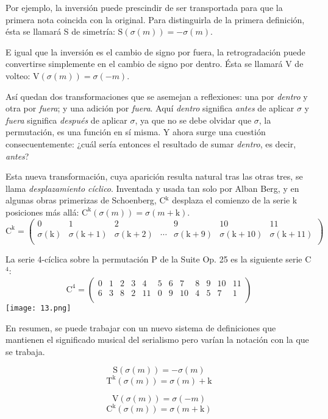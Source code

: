 		Por ejemplo, la inversión puede prescindir de ser transportada para que la primera nota coincida con la original. Para distinguirla de la primera definición, ésta se llamará S de simetría: $\text{S}(\sigma(m)) = -\sigma(m)$.
		
		E igual que la inversión es el cambio de signo por fuera, la retrogradación puede convertirse simplemente en el cambio de signo por dentro. Ésta se llamará V de volteo: $\text{V}(\sigma(m)) = \sigma(-m)$.
		
		Así quedan dos transformaciones que se asemejan a reflexiones: una por \textit{dentro} y otra por \textit{fuera}; y una adición por \textit{fuera}. Aquí \textit{dentro} significa \textit{antes} de aplicar $\sigma$ y \textit{fuera} significa \textit{después} de aplicar $\sigma$, ya que no se debe olvidar que $\sigma$, la permutación, es una función en sí misma. Y ahora surge una cuestión consecuentemente: ¿cuál sería entonces el resultado de sumar \textit{dentro}, es decir, \textit{antes}?
		
		Esta nueva transformación, cuya aparición resulta natural tras las otras tres, se llama \textit{desplazamiento cíclico}. Inventada y usada tan solo por Alban Berg, y en algunas obras primerizas de Schoenberg, C$^\text{k}$ desplaza el comienzo de la serie k posiciones más allá: $\text{C}^\text{k}\left(\sigma\left(m\right)\right)=\sigma\left(m+\text{k}\right)$.
		\[\text{C}^\text{k}=\left(\begin{matrix}0&1&2&&9&10&11\\\sigma\left(\text{k}\right)&\sigma\left(\text{k}+1\right)&\sigma\left(\text{k}+2\right)&\cdots&\sigma\left(\text{k}+9\right)&\sigma\left(\text{k}+10\right)&\sigma\left(\text{k}+11\right)\\\end{matrix}\right)\]
		
		La serie 4-cíclica sobre la permutación P de la Suite Op. 25 es la siguiente serie C$^4$:	
		\[\text{C}^4=\left(\begin{matrix}0&1&2&3&4&5&6&7&8&9&10&11\\6&3&8&2&11&0&9&10&4&5&7&1\\\end{matrix}\right)\]		
		\texttt{[image: 13.png]}
		
		En resumen, se puede trabajar con un nuevo sistema de definiciones que mantienen el significado musical del serialismo pero varían la notación con la que se trabaja. 
		\vspace{-0.5cm}
		\begin{multicols}{2}
		\[\text{S}(\sigma(m)) = -\sigma(m)\]
		\[\text{T}^\text{k}(\sigma(m)) = \sigma(m) + \text{k}\]
		
		\[\text{V}(\sigma(m)) = \sigma(-m)\]
		\[\text{C}^\text{k}(\sigma(m))=\sigma(m+\text{k})\]
		\end{multicols}
		
